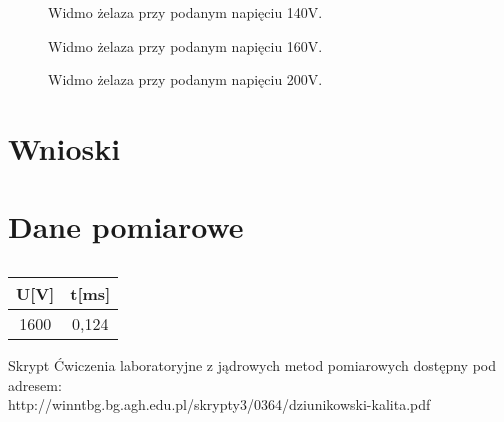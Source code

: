 \documentclass[11pt,a4paper]{article}
\begin{document}
\begin{figure}[H]
\centering
\resizebox{.8\linewidth}{!}{}
\caption{Widmo żelaza przy podanym napięciu 140V.}
\label{fig1}
\end{figure}

\begin{figure}[H]
\centering
\resizebox{.8\linewidth}{!}{}
\caption{Widmo żelaza przy podanym napięciu 160V.}
\label{fig1}
\end{figure}

\begin{figure}[H]
\centering
\resizebox{.8\linewidth}{!}{}
\caption{Widmo żelaza przy podanym napięciu 200V.}
\label{fig1}
\end{figure}

\section{Wnioski}

\section{Dane pomiarowe}

\begin{longtable}{cc}
	\caption{\color{red}{????????}}\\
\label{dt2}
U[V]	&	t[ms] \\ \hline
\endhead
1600	&0,124 \\
\end{longtable}

\begin{thebibliography}{9}
Skrypt Ćwiczenia laboratoryjne z jądrowych metod pomiarowych dostępny pod adresem:\\http://winntbg.bg.agh.edu.pl/skrypty3/0364/dziunikowski-kalita.pdf 
\end{thebibliography}
\end{document}

